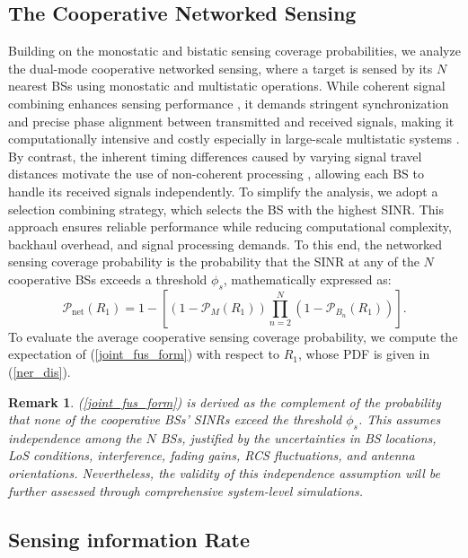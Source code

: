 \documentclass[journal]{IEEEtran}
\newtheorem{remark}{\textbf{Remark}}
\begin{document}
\subsection{The Cooperative Networked Sensing }
Building on the monostatic and bistatic sensing coverage probabilities, we analyze the dual-mode cooperative networked sensing, where a target is sensed by its \( N \) nearest BSs using monostatic and multistatic operations. While coherent signal combining enhances sensing performance \cite{yang2011phase}, it demands stringent synchronization and precise phase alignment between transmitted and received signals, making it computationally intensive and costly especially in large-scale multistatic systems \cite{yang2011phase,sadeghi2021target}. By contrast, the inherent timing differences caused by varying signal travel distances motivate the use of non-coherent processing \cite{sadeghi2021target}, allowing each BS to handle its received signals independently.
To simplify the analysis, we adopt a selection combining strategy, which selects the BS with the highest SINR. This approach ensures reliable performance while reducing computational complexity, backhaul overhead, and signal processing demands.
To this end, the networked sensing coverage probability is the probability that the SINR at any of the $N$ cooperative  BSs exceeds a threshold \( \phi_s \), mathematically expressed as:
\begin{equation}\label{joint_fus_form}
  \mathcal{P}_{\text{net}}(R_1) = 1 - \left[(1 - \mathcal{P}_M(R_1)) \prod_{n=2}^{N} (1 - \mathcal{P}_{B_n}(R_1))\right].  
\end{equation}
To evaluate the average cooperative sensing coverage probability, we compute the expectation of (\ref{joint_fus_form}) with respect to \(R_1\), whose PDF is given in (\ref{ner_dis}). 
\begin{remark}
(\ref{joint_fus_form}) is derived as the complement of the probability that none of the cooperative BSs' SINRs exceed the threshold \( \phi_s \). This assumes independence among the \( N \) BSs, justified by the uncertainties in BS locations, LoS conditions, interference, fading gains, RCS fluctuations, and antenna orientations. Nevertheless, the validity of this independence assumption will be further assessed through comprehensive system-level simulations.
\end{remark}
 


\subsection{Sensing information Rate}
\end{document}
